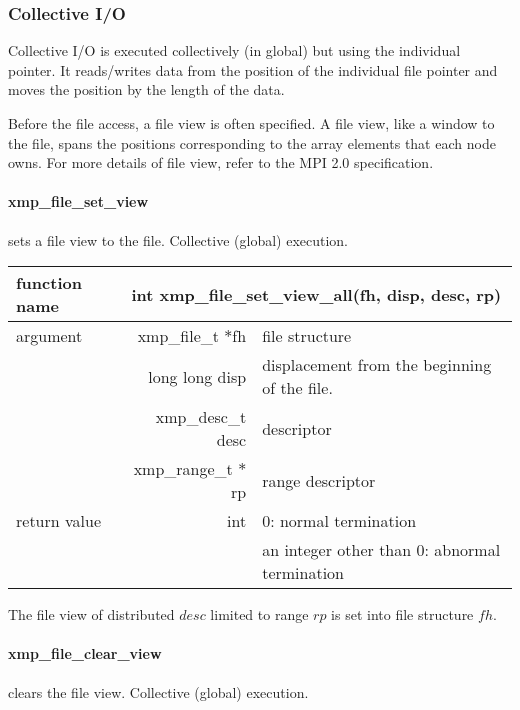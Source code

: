    \subsubsection{Collective I/O}

   Collective I/O is executed collectively (in global) but using the individual pointer.
   It reads/writes data from the position of the individual file pointer and moves the position
   by the length of the data.

   Before the file access, a file view is often specified. A file view, like a window to the file, 
   spans the positions corresponding to the array elements that each node owns. 
   For more details of file view, refer to the MPI 2.0 specification.

   \paragraph{ xmp\_file\_set\_view} sets a file view to the file. Collective (global) execution.

   \begin{table}[h]
    \begin{center}
     \begin{tabular}{|l|r|p{70mm}|}
      \hline
      {\bf function name}  & \multicolumn{2}{c|}{\bf int xmp\_file\_set\_view\_all(fh,
      disp, desc, rp)} \\ \hline \hline
      argument & xmp\_file\_t $*$fh & file structure \\ \cline{2-3}
      & long long disp & displacement from the beginning of the file. \\ \cline{2-3}
      & xmp\_desc\_t desc & descriptor \\ \cline{2-3}
      & xmp\_range\_t $*$rp & range descriptor \\ \hline
      return value & int & 0: normal termination \\
      &  & an integer other than 0: abnormal termination \\ \hline
      \end{tabular}
     \end{center}
    \label{tb:aaa}
   \end{table}

  The file view of distributed $desc$ limited to range $rp$ is set into file structure $fh$.
   
   \paragraph{ xmp\_file\_clear\_view} clears the file view. Collective (global) execution.


